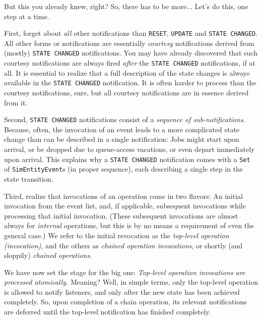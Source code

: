 \documentclass[12pt]{book}
\begin{document}
But this you already knew, right? So, there has to be more...
Let's do this, one step at a time.

First, forget about {\em all\/} other notifications
  than \lstinline|RESET|, \lstinline|UPDATE| and \lstinline|STATE CHANGED|.
All other forms or notifications are essentially
  {\em courtesy\/} notifications derived from
  (mostly) \lstinline|STATE CHANGED| notifications.
You may have already discovered that such courtesy notifications
  are always fired {\em after\/} the \lstinline|STATE CHANGED|
  notifications, if at all.
It is essential to realize that a full description
  of the state changes is always available in the \lstinline|STATE CHANGED|
  notification.
It is often harder to process than the courtesy notifications, sure,
  but all courtesy notifications are in essence derived from it.

Second,
  \lstinline|STATE CHANGED| notifications
  consist of a {\em sequence of sub-notifications}.
Because, often,
  the invocation of an event leads to a more
  complicated state change than can be described
  in a single notification:
  Jobs might start upon arrival,
  or be dropped due to queue-access vacations,
  or even depart immediately upon arrival.
This explains why a \lstinline|STATE CHANGED|
  notification comes with a \lstinline|Set|
  of \lstinline|SimEntityEvent|s (in proper sequence),
  each describing a single step in the state transition.

Third, realize that invocations of an operation
  come in two flavors: An initial invocation
  from the event list, and, if applicable, subsequent
  invocations while processing that
  initial invocation.
(These subsequent invocations are almost always for {\em internal\/}
  operations, but this is by no means a requirement of even the general case.)
We refer to the initial revocation as the {\em top-level operation (invocation)},
  and the others as {\em chained operation invocations},
  or shortly (and sloppily) {\em chained operations}.

We have now set the stage for the big one:
  {\em Top-level operation invocations are processed atomically.}
Meaning? Well, in simple terms, only the top-level operation
  is allowed to notify listeners,
  and only after the new state has been achieved completely.
So, upon completion of a chain operation,
  its relevant notifications are deferred until
  the top-level notification has finished completely.
\end{document}
